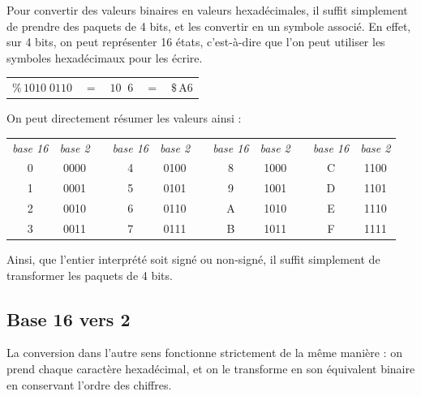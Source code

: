 \documentclass[11pt,a4paper]{article}
\begin{document}
Pour convertir des valeurs binaires en valeurs hexadécimales, il suffit simplement de prendre des paquets de 4 bits, et les convertir en un symbole associé.
En effet, sur 4 bits, on peut représenter 16 états, c'est-à-dire que l'on peut utiliser les symboles hexadécimaux pour les écrire.

\bigskip

\begin{tabular}{l c c c c}
$ \% \, 1010 \; 0110 $  &  $ = $  & $ 10 \; \; 6 $ & $ = $ & $ \$ \, \text{A} 6 $ \\
\end{tabular}

\bigskip

On peut directement résumer les valeurs ainsi :

\begin{center}
\begin{tabular}{ | c | c |  m{0.8cm}  | c | c |  m{0.8cm}  | c | c |  m{0.8cm}  | c | c | }
\cline{1-2} \cline{4-5} \cline{7-8} \cline{10-11}
\textit{base 16} & \textit{base 2} & & \textit{base 16} & \textit{base 2} & & \textit{base 16} & \textit{base 2} & & \textit{base 16} & \textit{base 2} \\
\cline{1-2} \cline{4-5} \cline{7-8} \cline{10-11}
0 & 0000 &   & 4 & 0100 &   & 8 & 1000 &   & C & 1100 \\
1 & 0001 &   & 5 & 0101 &   & 9 & 1001 &   & D & 1101 \\
2 & 0010 &   & 6 & 0110 &   & A & 1010 &   & E & 1110 \\
3 & 0011 &   & 7 & 0111 &   & B & 1011 &   & F & 1111 \\
\cline{1-2} \cline{4-5} \cline{7-8} \cline{10-11}
\end{tabular}
\end{center}

\bigskip

Ainsi, que l'entier interprété soit signé ou non-signé, il suffit simplement de transformer les paquets de 4 bits.


\subsection{Base 16 vers 2}

\bigskip

La conversion dans l'autre sens fonctionne strictement de la même manière : on prend chaque caractère hexadécimal, et on le transforme en son équivalent binaire en conservant l'ordre des chiffres.
\end{document}
